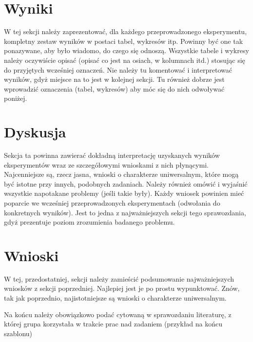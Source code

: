 \documentclass{classrep}
\begin{document}
\section{Wyniki}
{\color{blue}
W tej sekcji należy zaprezentować, dla każdego przeprowadzonego eksperymentu,
kompletny zestaw wyników w postaci tabel, wykresów itp. Powinny być one tak
ponazywane, aby było wiadomo, do czego się odnoszą. Wszystkie tabele i wykresy
należy oczywiście opisać (opisać co jest na osiach, w kolumnach itd.) stosując
się do przyjętych wcześniej oznaczeń. Nie należy tu komentować i interpretować
wyników, gdyż miejsce na to jest w kolejnej sekcji. Tu również dobrze jest
wprowadzić oznaczenia (tabel, wykresów) aby móc się do nich odwoływać
poniżej.}

\section{Dyskusja}
{\color{blue}
Sekcja ta powinna zawierać dokładną interpretację uzyskanych wyników
eksperymentów wraz ze szczegółowymi wnioskami z nich płynącymi. Najcenniejsze
są, rzecz jasna, wnioski o charakterze uniwersalnym, które mogą być istotne
przy innych, podobnych zadaniach. Należy również omówić i wyjaśnić wszystkie
napotakane problemy (jeśli takie były). Każdy wniosek powinien mieć poparcie
we wcześniej przeprowadzonych eksperymentach (odwołania do konkretnych
wyników). Jest to jedna z najważniejszych sekcji tego sprawozdania, gdyż
prezentuje poziom zrozumienia badanego problemu.}
\section{Wnioski}
{\color{blue}W tej, przedostatniej, sekcji należy zamieścić podsumowanie
najważniejszych wniosków z sekcji poprzedniej. Najlepiej jest je po prostu
wypunktować. Znów, tak jak poprzednio, najistotniejsze są wnioski o
charakterze uniwersalnym.}


\begin{thebibliography}{0}
\end{thebibliography}
{\color{blue}
Na końcu należy obowiązkowo podać cytowaną w sprawozdaniu
literaturę, z której grupa korzystała w trakcie prac nad zadaniem (przykład na
końcu szablonu)}
\end{document}
